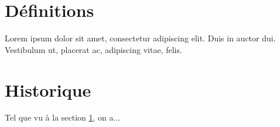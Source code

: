 \documentclass[11pt]{article}
\begin{document}
\section{Définitions}
\label{sec:definitions}

Lorem ipsum dolor sit amet, consectetur adipiscing elit.
Duis in auctor dui. Vestibulum ut, placerat ac, adipiscing
vitae, felis.

\section{Historique}

Tel que vu à la section \ref{sec:definitions}, on a...
\end{document}
